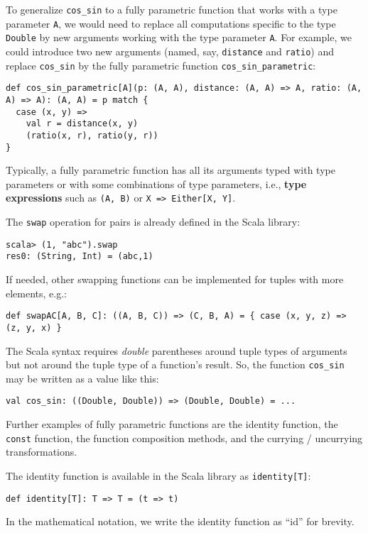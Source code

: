 To generalize \lstinline!cos_sin! to a fully parametric function
that works with a type parameter \lstinline!A!, we would need to
replace all computations specific to the type \lstinline!Double!
by new arguments working with the type parameter \lstinline!A!. For
example, we could introduce two new arguments (named, say, \lstinline!distance!
and \lstinline!ratio!) and replace \lstinline!cos_sin! by the fully
parametric function \lstinline!cos_sin_parametric!:
\begin{lstlisting}
def cos_sin_parametric[A](p: (A, A), distance: (A, A) => A, ratio: (A, A) => A): (A, A) = p match {
  case (x, y) =>
    val r = distance(x, y)
    (ratio(x, r), ratio(y, r))
}
\end{lstlisting}

Typically, a fully parametric function has all its arguments typed
with type parameters or with some combinations of type parameters,
i.e., \textbf{type expressions} such as \lstinline!(A, B)!
or \lstinline!X => Either[X, Y]!.

The \lstinline!swap! operation for pairs is already defined in the
Scala library:
\begin{lstlisting}
scala> (1, "abc").swap
res0: (String, Int) = (abc,1)
\end{lstlisting}
If needed, other swapping functions can be implemented for tuples
with more elements, e.g.:
\begin{lstlisting}
def swapAC[A, B, C]: ((A, B, C)) => (C, B, A) = { case (x, y, z) => (z, y, x) }
\end{lstlisting}
The Scala syntax requires \emph{double} parentheses around tuple types
of arguments but not around the tuple type of a function\textsf{'}s result.
So, the function \lstinline!cos_sin! may be written as a value like
this:
\begin{lstlisting}
val cos_sin: ((Double, Double)) => (Double, Double) = ...
\end{lstlisting}

Further examples of fully parametric functions are the identity function,
the \lstinline!const! function, the function composition methods,
and the currying / uncurrying transformations. 

The identity function is available in the
Scala library as \lstinline!identity[T]!:
\begin{lstlisting}
def identity[T]: T => T = (t => t)
\end{lstlisting}
In the mathematical notation, we write the identity function as \textsf{``}$\text{id}$\textsf{''}
for brevity.


